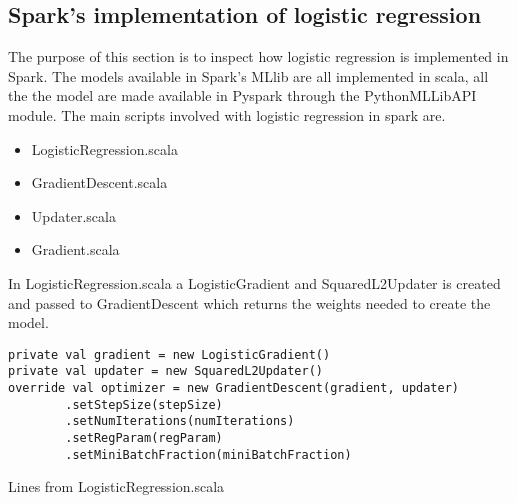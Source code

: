 \subsection{Spark's implementation of logistic regression}
The purpose of this section is to inspect how logistic regression is implemented in Spark.  
The models available in Spark's MLlib are all implemented in scala, all the the model are made available in Pyspark through the PythonMLLibAPI module. 
The main scripts involved with logistic regression in spark are. 
\begin{itemize}
\item LogisticRegression.scala
\item GradientDescent.scala
\item Updater.scala 
\item Gradient.scala
\end{itemize}
In LogisticRegression.scala a LogisticGradient and SquaredL2Updater is created and passed to GradientDescent which returns the weights needed to create the model. 

\begin{listing}[H]
\begin{verbatim}
private val gradient = new LogisticGradient()
private val updater = new SquaredL2Updater()
override val optimizer = new GradientDescent(gradient, updater)
        .setStepSize(stepSize)
        .setNumIterations(numIterations)
        .setRegParam(regParam)
        .setMiniBatchFraction(miniBatchFraction)
\end{verbatim}
\caption{Lines from LogisticRegression.scala}
\label{lst:gd_logreg}
\end{listing}

